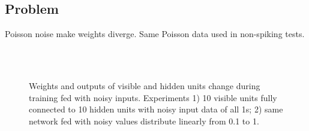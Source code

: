 \documentclass[conference]{IEEEtran}
\begin{document}
\subsection{Problem}
Poisson noise make weights diverge.
Same Poisson data used in non-spiking tests.
	\begin{figure}
		\\
		\\
		\caption{Weights and outputs of visible and hidden units change during training fed with noisy inputs. 
		Experiments 1) 10 visible units fully connected to 10 hidden units with noisy input data of all 1s; 2) same network fed with noisy values distribute linearly from 0.1 to 1.}
	\end{figure}
	
\end{document}
